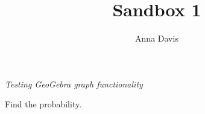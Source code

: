 \documentclass{ximera}
\author{Anna Davis} \title{Sandbox 1}
\begin{document}
\begin{abstract}

\end{abstract}
\maketitle
 \textit{Testing GeoGebra graph functionality}

\begin{problem}\label{prob:sandbox1prob1}
 Find the probability.
\begin{center}  
\end{center}
\end{problem}
\end{document}

